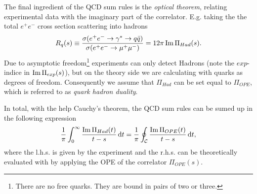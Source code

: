 \documentclass[../../index.tex]{subfiles}
\begin{document}
The final ingredient of the QCD sum rules is the \textit{optical theorem},
relating experimental data with the imaginary part of the correlator. E.g.
taking the the total $e^+ e^-$ cross section scattering into hadrons
\begin{equation}
  R_q(s) \equiv \frac{\sigma(e^+ e^- \to \gamma^* \to q \bar q)}{\sigma(e^+ e^- \to \mu^+ \mu^-)} = 12 \pi \operatorname{Im} \Pi_{Had}(s).
\end{equation}
Due to asymptotic freedom\footnote{There are no free quarks. They are bound in
  pairs of two or three.} experiments can only detect Hadrons (note the
$exp$-indice in $\operatorname{Im} \Pi_{exp}(s)$), but on the theory
side we are calculating with quarks as degrees of freedom. Consequently we
assume that $\Pi_{Had}$ can be set equal to $\Pi_{OPE}$, which is referred
to as \textit{quark hadron duality}.

In total, with the help Cauchy's theorem, the QCD sum rules can be sumed up in
the following expression
\begin{equation}
  \label{eq:qcdSumRules}
  \frac{1}{\pi}\int_0^\infty \frac{\Ima \Pi_{Had}(t)}{t - s}\dif t = \frac{1}{\pi} \oint_{\mathcal{C}} \frac{\Ima \Pi_{OPE}(t)}{t -s}\dif t,
\end{equation}
where the l.h.s. is given by the experiment and the r.h.s. can be theoretically
evaluated with by applying the OPE of the correlator $\Pi_{OPE}(s)$.
\end{document}
